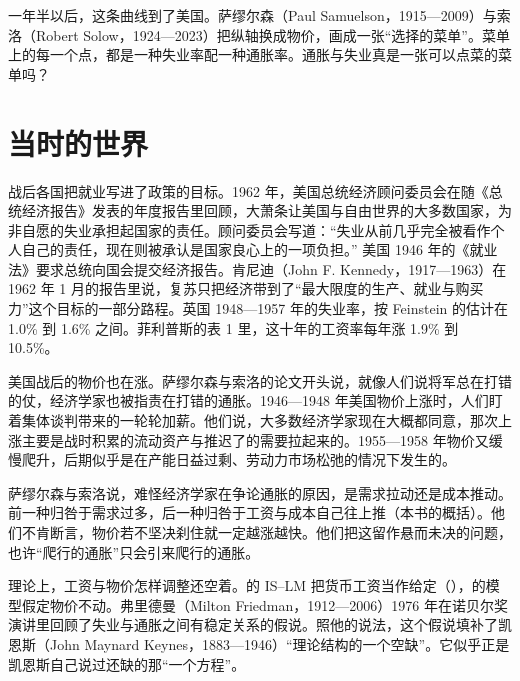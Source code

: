 一年半以后，这条曲线到了美国。萨缪尔森（Paul Samuelson，1915—2009）与索洛（Robert Solow，1924—2023）把纵轴换成物价，画成一张“选择的菜单”\cite{samuelson1960,loc38,gnd38}。菜单上的每一个点，都是一种失业率配一种通胀率。通胀与失业真是一张可以点菜的菜单吗？

\section{当时的世界}\label{sec:phillips-world}

战后各国把就业写进了政策的目标。1962 年，美国总统经济顾问委员会在随《总统经济报告》发表的年度报告里回顾，大萧条让美国与自由世界的大多数国家，为非自愿的失业承担起国家的责任\cite{erp1962}。顾问委员会写道：“失业从前几乎完全被看作个人自己的责任，现在则被承认是国家良心上的一项负担。”\cite{erp1962} 美国 1946 年的《就业法》要求总统向国会提交经济报告\cite{erp1962}。肯尼迪（John F. Kennedy，1917—1963）在 1962 年 1 月的报告里说，复苏只把经济带到了“最大限度的生产、就业与购买力”这个目标的一部分路程\cite{erp1962,loc38}。英国 1948—1957 年的失业率，按 Feinstein 的估计在 1.0\% 到 1.6\% 之间\cite{boe2017}。菲利普斯的表 1 里，这十年的工资率每年涨 1.9\% 到 10.5\%\cite{phillips1958}。

美国战后的物价也在涨。萨缪尔森与索洛的论文开头说，就像人们说将军总在打错的仗，经济学家也被指责在打错的通胀\cite{samuelson1960}。1946—1948 年美国物价上涨时，人们盯着集体谈判带来的一轮轮加薪\cite{samuelson1960}。他们说，大多数经济学家现在大概都同意，那次上涨主要是战时积累的流动资产与推迟了的需要拉起来的\cite{samuelson1960}。1955—1958 年物价又缓慢爬升，后期似乎是在产能日益过剩、劳动力市场松弛的情况下发生的\cite{samuelson1960}。

萨缪尔森与索洛说，难怪经济学家在争论通胀的原因，是需求拉动还是成本推动\cite{samuelson1960}。前一种归咎于需求过多，后一种归咎于工资与成本自己往上推（本书的概括）。他们不肯断言，物价若不坚决刹住就一定越涨越快\cite{samuelson1960}。他们把这留作悬而未决的问题，也许“爬行的通胀”只会引来爬行的通胀\cite{samuelson1960}。

理论上，工资与物价怎样调整还空着。的 IS–LM 把货币工资当作给定（），的模型假定物价不动。弗里德曼（Milton Friedman，1912—2006）1976 年在诺贝尔奖演讲里回顾了失业与通胀之间有稳定关系的假说\cite{friedman1976,loc38}。照他的说法，这个假说填补了凯恩斯（John Maynard Keynes，1883—1946）“理论结构的一个空缺”\cite{friedman1976,loc38}。它似乎正是凯恩斯自己说过还缺的那“一个方程”\cite{friedman1976}。

